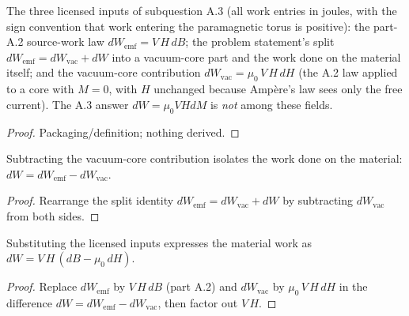 \begin{definition}
\label{def:IPhO2026Problems_problem_IPhO_2026_3_A_3:PmTWorkBudget}
The three licensed inputs of subquestion A.3 (all work entries in joules,
with the sign convention that work entering the paramagnetic torus is
positive): the part-A.2 source-work law $dW_{\mathrm{emf}} = V\,H\,dB$;
the problem statement's split
$dW_{\mathrm{emf}} = dW_{\mathrm{vac}} + dW$ into a vacuum-core part and
the work done on the material itself; and the vacuum-core contribution
$dW_{\mathrm{vac}} = \mu_0\,V\,H\,dH$ (the A.2 law applied to a core with
$M = 0$, with $H$ unchanged because Ampère's law sees only the free
current). The A.3 answer $dW = \mu_0 V H dM$ is \emph{not} among these
fields.
\end{definition}
\begin{proof}
Packaging/definition; nothing derived.
\end{proof}

\begin{lemma}
\label{lem:IPhO2026Problems_problem_IPhO_2026_3_A_3:dW_eq_sub_vac}
Subtracting the vacuum-core contribution isolates the work done on the
material: $dW = dW_{\mathrm{emf}} - dW_{\mathrm{vac}}$.
\end{lemma}
\begin{proof}
Rearrange the split identity
$dW_{\mathrm{emf}} = dW_{\mathrm{vac}} + dW$ by subtracting
$dW_{\mathrm{vac}}$ from both sides.
\end{proof}

\begin{lemma}
\label{lem:IPhO2026Problems_problem_IPhO_2026_3_A_3:dW_eq_VH_dB_sub_mu0_dH}
Substituting the licensed inputs expresses the material work as
$dW = V\,H\,(dB - \mu_0\,dH)$.
\end{lemma}
\begin{proof}
Replace $dW_{\mathrm{emf}}$ by $V\,H\,dB$ (part A.2) and
$dW_{\mathrm{vac}}$ by $\mu_0\,V\,H\,dH$ in the difference
$dW = dW_{\mathrm{emf}} - dW_{\mathrm{vac}}$, then factor out $V\,H$.
\end{proof}

